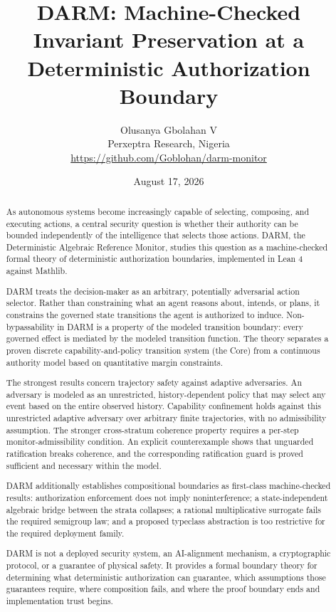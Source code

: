 \documentclass[11pt]{article}
\title{\textbf{DARM: Machine-Checked Invariant Preservation at a Deterministic Authorization Boundary}}
\author{Olusanya Gbolahan V\\Perxeptra Research, Nigeria\\\url{https://github.com/Goblohan/darm-monitor}}
\date{August 17, 2026}
\begin{document}
\maketitle

\begin{abstract}
As autonomous systems become increasingly capable of selecting, composing, and executing actions, a central security question is whether their authority can be bounded independently of the intelligence that selects those actions. DARM, the Deterministic Algebraic Reference Monitor, studies this question as a machine-checked formal theory of deterministic authorization boundaries, implemented in Lean 4 against Mathlib.

DARM treats the decision-maker as an arbitrary, potentially adversarial action selector. Rather than constraining what an agent reasons about, intends, or plans, it constrains the governed state transitions the agent is authorized to induce. Non-bypassability in DARM is a property of the modeled transition boundary: every governed effect is mediated by the modeled transition function. The theory separates a proven discrete capability-and-policy transition system (the Core) from a continuous authority model based on quantitative margin constraints.

The strongest results concern trajectory safety against adaptive adversaries. An adversary is modeled as an unrestricted, history-dependent policy that may select any event based on the entire observed history. Capability confinement holds against this unrestricted adaptive adversary over arbitrary finite trajectories, with no admissibility assumption. The stronger cross-stratum coherence property requires a per-step monitor-admissibility condition. An explicit counterexample shows that unguarded ratification breaks coherence, and the corresponding ratification guard is proved sufficient and necessary within the model.

DARM additionally establishes compositional boundaries as first-class machine-checked results: authorization enforcement does not imply noninterference; a state-independent algebraic bridge between the strata collapses; a rational multiplicative surrogate fails the required semigroup law; and a proposed typeclass abstraction is too restrictive for the required deployment family.

DARM is not a deployed security system, an AI-alignment mechanism, a cryptographic protocol, or a guarantee of physical safety. It provides a formal boundary theory for determining what deterministic authorization can guarantee, which assumptions those guarantees require, where composition fails, and where the proof boundary ends and implementation trust begins.
\end{abstract}
\end{document}
